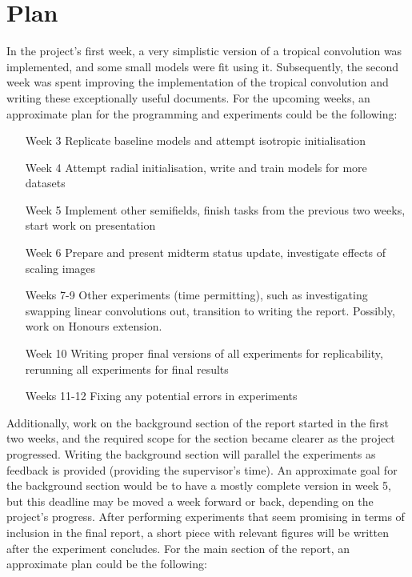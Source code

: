 \documentclass[11pt]{article} %
\begin{document}
\newpage
\section{Plan}
In the project's first week, a very simplistic version of a tropical convolution was implemented, and some small models were fit using it. Subsequently, the second week was spent improving the implementation of the tropical convolution and writing these exceptionally useful documents. For the upcoming weeks, an approximate plan for the programming and experiments could be the following:

\begin{enumerate}
	\item[Week 3] Replicate baseline models and attempt isotropic initialisation 
	\item[Week 4] Attempt radial initialisation, write and train models for more datasets
	\item[Week 5] Implement other semifields, finish tasks from the previous two weeks, start work on presentation
	\item[Week 6] Prepare and present midterm status update, investigate effects of scaling images
	\item[Weeks 7-9] Other experiments (time permitting), such as investigating swapping linear convolutions out, transition to writing the report. Possibly, work on Honours extension.
	\item[Week 10] Writing proper final versions of all experiments for replicability, rerunning all experiments for final results
	\item[Weeks 11-12] Fixing any potential errors in experiments
\end{enumerate}

Additionally, work on the background section of the report started in the first two weeks, and the required scope for the section became clearer as the project progressed. Writing the background section will parallel the experiments as feedback is provided (providing the supervisor's time). An approximate goal for the background section would be to have a mostly complete version in week 5, but this deadline may be moved a week forward or back, depending on the project's progress. After performing experiments that seem promising in terms of inclusion in the final report, a short piece with relevant figures will be written after the experiment concludes. For the main section of the report, an approximate plan could be the following:
\end{document}
